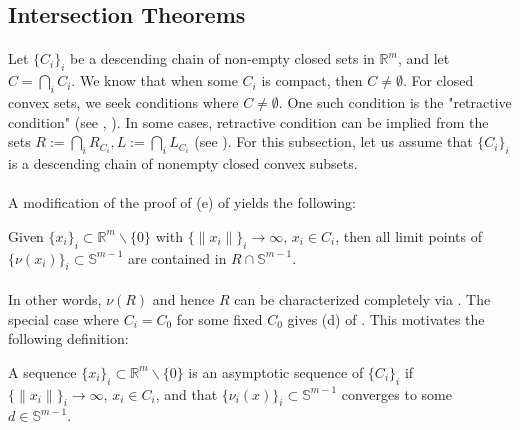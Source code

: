 \subsection{Intersection Theorems}

\paragraph{}Let $\{C_i\}_i$ be a descending chain of non-empty closed sets in $\mathbb{R}^m$, and let $C=\bigcap_iC_i$. We know that when some $C_i$ is compact, then $C\neq\emptyset$. For closed convex sets, we seek conditions where $C\neq\emptyset$. One such condition is the "retractive condition" (see , ). In some cases, retractive condition can be implied from the sets $R:=\bigcap_i R_{C_i},L:=\bigcap_i L_{C_i}$ (see ). For this subsection, let us assume that $\{C_i\}_i$ is a descending chain of nonempty closed convex subsets.
\paragraph{}A modification of the proof of (e) of  yields the following:

\begin{prop}
	\label{prop:014-construction-recession}
	Given $\{x_i\}_i\subset \mathbb{R}^m\smallsetminus \{0\}$ with $\{\|x_i\|\}_i\to\infty$, $x_i\in C_i$, then all limit points of $\{\nu(x_i)\}_i\subset \mathbb{S}^{m-1}$ are contained in $R\cap \mathbb{S}^{m-1}$.
\end{prop}

\paragraph{}In other words, $\nu(R)$ and hence $R$ can be characterized completely via . The special case where $C_i=C_0$ for some fixed $C_0$ gives (d) of . This motivates the following definition:

\begin{defn}
	\label{defn:014-asymptotic}
	A sequence $\{x_i\}_i\subset \mathbb{R}^m\smallsetminus\{0\}$ is an asymptotic sequence of $\{C_i\}_i$ if $\{\|x_i\|\}_i\to\infty$, $x_i\in C_i$, and that $\{\nu_i(x)\}_i\subset \mathbb{S}^{m-1}$ converges to some $d\in \mathbb{S}^{m-1}$.
\end{defn}

